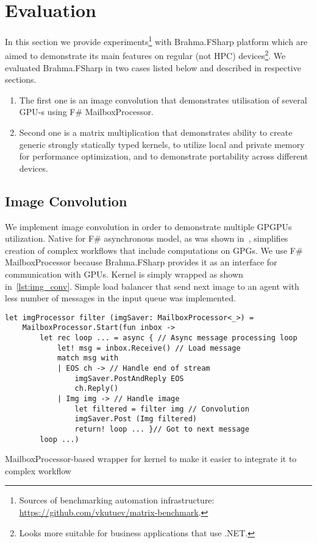 \section{Evaluation}

In this section we provide experiments\footnote{Sources of benchmarking automation infrastructure: \url{https://github.com/vkutuev/matrix-benchmark}.} with Brahma.FSharp platform which are aimed to demonstrate its main features on regular (not HPC) devices\footnote{Looks more suitable for business applications that use .NET.}. 
We evaluated Brahma.FSharp in two cases listed below and described in respective sections.
\begin{enumerate}
\item The first one is an image convolution that demonstrates utilisation of several GPU-s using F\# MailboxProcessor.
\item Second one is a matrix multiplication that demonstrates ability to create generic strongly statically typed kernels, to utilize local and private memory for performance optimization, and to demonstrate portability across different devices.
\end{enumerate}


\subsection{Image Convolution}

We implement image convolution in order to demonstrate multiple GPGPUs utilization.
Native for F\# asynchronous model, as was shown in~\cite{aleaGPUasync}, simplifies creation of complex workflows that include computations on GPGs.
We use F\# MailboxProcessor because Brahma.FSharp provides it as an interface for communication with GPUs.
Kernel is simply wrapped as shown in~\ref{lst:img_conv}. 
Simple load balancer that send next image to an agent with less number of messages in the input queue was implemented.

\begin{listing}[h]
  \begin{verbatim}
let imgProcessor filter (imgSaver: MailboxProcessor<_>) =
    MailboxProcessor.Start(fun inbox ->
        let rec loop ... = async { // Async message processing loop
            let! msg = inbox.Receive() // Load message
            match msg with
            | EOS ch -> // Handle end of stream
                imgSaver.PostAndReply EOS
                ch.Reply()
            | Img img -> // Handle image
                let filtered = filter img // Convolution
                imgSaver.Post (Img filtered)
                return! loop ... }// Got to next message
        loop ...)
  \end{verbatim}
  \caption{MailboxProcessor-based wrapper for kernel to make it easier to integrate it to complex workflow}
  \label{lst:img_conv}
\end{listing}

